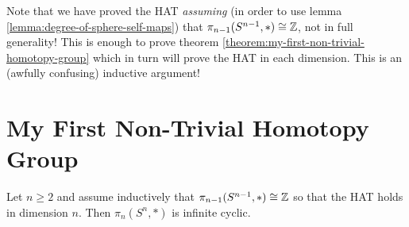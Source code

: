 \begin{remark}
Note that we have proved the HAT \textit{assuming} (in order to use lemma \ref{lemma:degree-of-sphere-self-maps}) that $\pi_{n-1}(S^{n-1},*)\cong{\mathbb Z}$, not in full generality! This is enough to prove theorem \ref{theorem:my-first-non-trivial-homotopy-group} which in turn will prove the HAT in each dimension. This is an (awfully confusing) inductive argument!
\end{remark}

\section{My First Non-Trivial Homotopy Group}

\begin{theorem}\label{theorem:my-first-non-trivial-homotopy-group}
Let $n\geq2$ and assume inductively that $\pi_{n-1}(S^{n-1},*)\cong{\mathbb Z}$ so that the HAT holds in dimension $n$. Then $\pi_n(S^n,*)$ is infinite cyclic.
\end{theorem}

